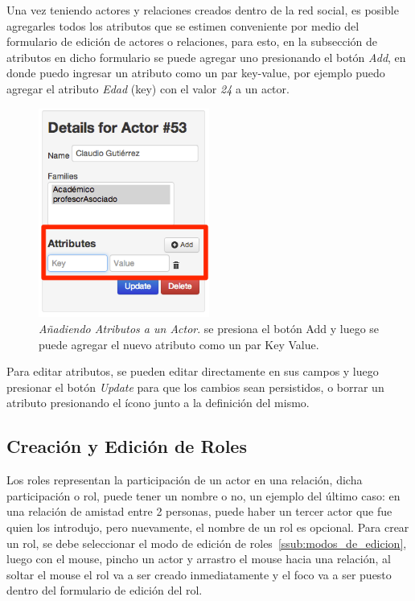 Una vez teniendo actores y relaciones creados dentro de la red social, es posible agregarles todos los atributos que se estimen conveniente por medio del formulario de edición de actores o relaciones, para esto, en la subsección de atributos en dicho formulario se puede agregar uno presionando el botón \emph{Add}, en donde puedo ingresar un atributo como un par key-value, por ejemplo puedo agregar el atributo \emph{Edad} (key) con el valor \emph{24} a un actor.

\begin{figure}[H]
  \centering
  \includegraphics[width=0.5\textwidth]{images/insercion_atributos.png}
  \caption[Añadiendo Atributos a un Actor]{\emph{Añadiendo Atributos a un Actor}. se presiona el botón Add y luego se puede agregar el nuevo atributo como un par Key Value.}
  \label{insercion_atributos}
\end{figure}

Para editar atributos, se pueden editar directamente en sus campos y luego presionar el botón \emph{Update} para que los cambios sean persistidos, o borrar un atributo presionando el ícono junto a la definición del mismo.


\subsection{Creación y Edición de Roles} %
\label{sub:creacion_y_edicion_de_roles}

Los roles representan la participación de un actor en una relación, dicha participación o rol, puede tener un nombre o no, un ejemplo del último caso: en una relación de amistad entre 2 personas, puede haber un tercer actor que fue quien los introdujo, pero nuevamente, el nombre de un rol es opcional. Para crear un rol, se debe seleccionar el modo de edición de roles~\ref{ssub:modos_de_edicion}, luego con el mouse, pincho un actor y arrastro el mouse hacia una relación, al soltar el mouse el rol va a ser creado inmediatamente y el foco va a ser puesto dentro del formulario de edición del rol.

